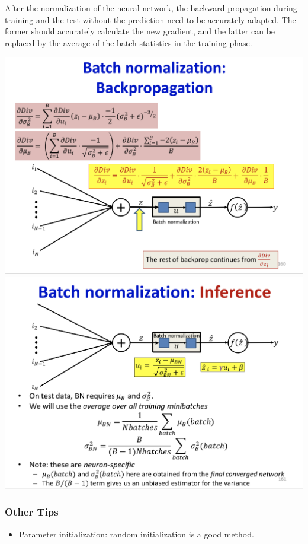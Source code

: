 \documentclass{article}
\begin{document}
	After the normalization of the neural network, the backward propagation during training and the test without the prediction need to be accurately adapted. The former should accurately calculate the new gradient, and the latter can be replaced by the average of the batch statistics in the training phase.
	
	\includegraphics[scale=0.2]{106.png}
	\includegraphics[scale=0.2]{107.png}
	
	\subsubsection{Other Tips} 
	
	\begin{itemize}
		\item Parameter initialization: random initialization is a good method. 
	\end{itemize}
\end{document}
